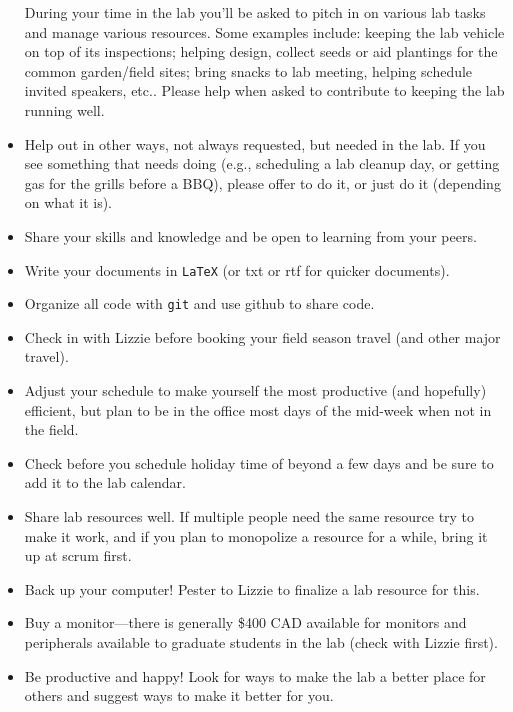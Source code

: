 \documentclass[11pt,a4paper,oneside]{article}
\begin{document}
\begin{itemize}
During your time in the lab you'll be asked to pitch in on various lab tasks and manage various resources. Some examples include: keeping the lab vehicle on top of its inspections; helping design, collect seeds or aid plantings for the common garden/field sites; bring snacks to lab meeting, helping schedule invited speakers, etc.. Please help when asked to contribute to keeping the lab running well. 
\item Help out in other ways, not always requested, but needed in the lab. If you see something that needs doing (e.g., scheduling a lab cleanup day, or getting gas for the grills before a BBQ), please offer to do it, or just do it (depending on what it is). 
\item Share your skills and knowledge and be open to learning from your peers. 
\item Write your documents in \verb|LaTeX| (or txt or rtf for quicker documents).
\item Organize all code with \verb|git| and use github to share code.
\item Check in with Lizzie before booking your field season travel (and other major travel). 
\item Adjust your schedule to make yourself the most productive (and hopefully) efficient, but plan to be in the office most days of the mid-week when not in the field.
\item Check before you schedule holiday time of beyond a few days and be sure to add it to the lab calendar.
\item Share lab resources well. If multiple people need the same resource try to make it work, and if you plan to monopolize a resource for a while, bring it up at scrum first. 
\item Back up your computer! Pester to Lizzie to finalize a lab resource for this.
\item Buy a monitor---there is generally \$400 CAD available for monitors and peripherals available to graduate students in the lab (check with Lizzie first). 
\item Be productive and happy! Look for ways to make the lab a better place for others and suggest ways to make it better for you. 
\end{itemize}

% 
\end{document}

